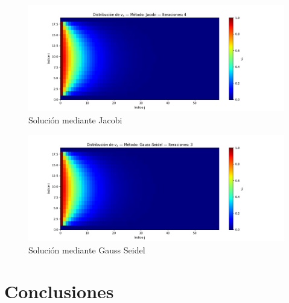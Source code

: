 \documentclass{article}
\begin{document}
  \begin{figure}[H]
      \centering
      \includegraphics[width=1.2\textwidth]{Jacobi.png}
      \caption{Solución mediante Jacobi}
  \end{figure}

  \begin{figure}[H]
      \centering
      \includegraphics[width=1.2\textwidth]{GaussSeidel.png}
      \caption{Solución mediante Gauss Seidel}
  \end{figure}

  \section*{Conclusiones}

  \renewcommand{\refname}{Referencias}
  
  
\end{document}
